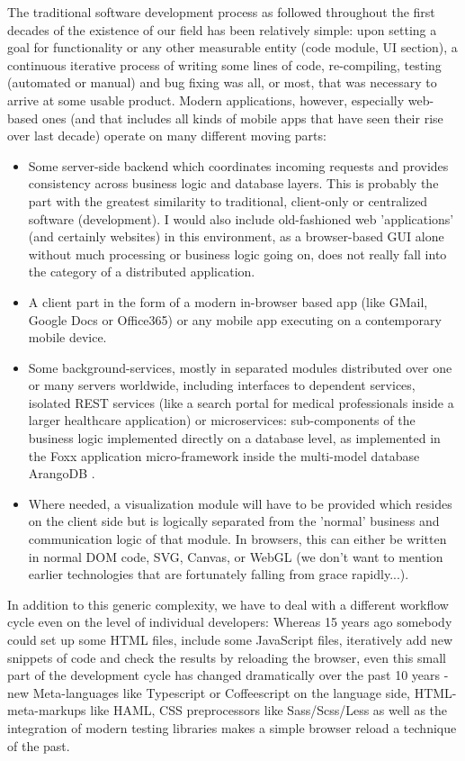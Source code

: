The traditional software development process as followed throughout the first decades of the existence of our field has been relatively simple: upon setting a goal for functionality or any other measurable entity (code module, UI section), a continuous iterative process of writing some lines of code, re-compiling, testing (automated or manual) and bug fixing was all, or most, that was necessary to arrive at some usable product. Modern applications, however, especially web-based ones (and that includes all kinds of mobile apps that have seen their rise over last decade) operate on many different moving parts:

\begin{itemize}
	\item Some server-side backend which coordinates incoming requests and provides consistency across business logic and database layers. This is probably the part with the greatest similarity to traditional, client-only or centralized software (development). I would also include old-fashioned web 'applications' (and certainly websites) in this environment, as a browser-based GUI alone without much processing or business logic going on, does not really fall into the category of a distributed application.
	\item A client part in the form of a modern in-browser based app (like GMail, Google Docs or Office365) or any mobile app executing on a contemporary mobile device.
	\item Some background-services, mostly in separated modules distributed over one or many servers worldwide, including interfaces to dependent services, isolated REST services (like a search portal for medical professionals inside a larger healthcare application) or microservices: sub-components of the business logic implemented directly on a database level, as implemented in the Foxx application micro-framework inside the multi-model database ArangoDB \citep{Foxx2014}.
	\item Where needed, a visualization module will have to be provided which resides on the client side but is logically separated from the 'normal' business and communication logic of that module. In browsers, this can either be written in normal DOM code, SVG, Canvas, or WebGL (we don't want to mention earlier technologies that are fortunately falling from grace rapidly...).
\end{itemize}

In addition to this generic complexity, we have to deal with a different workflow cycle even on the level of individual developers: Whereas 15 years ago somebody could set up some HTML files, include some JavaScript files, iteratively add new snippets of code and check the results by reloading the browser, even this small part of the development cycle has changed dramatically over the past 10 years - new Meta-languages like Typescript or Coffeescript on the language side, HTML-meta-markups like HAML, CSS preprocessors like Sass/Scss/Less as well as the integration of modern testing libraries makes a simple browser reload a technique of the past.

